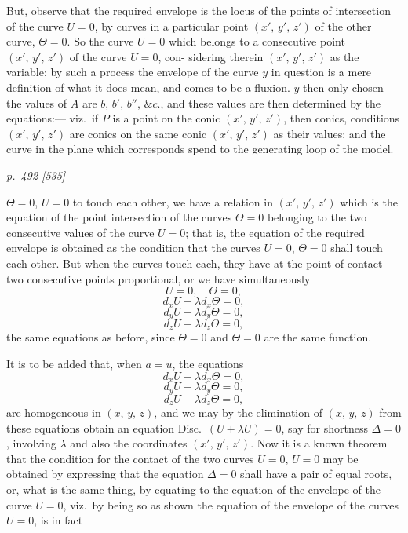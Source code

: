 \documentclass[11pt,a4paper]{book}
\begin{document}
But, observe that the required envelope is the locus of the points of intersection
of the curve $U=0$, by curves in a particular point $(x',\,y',\,z')$ of the other curve, $\Theta=0$. So
the curve $U=0$ which belongs to a consecutive point $(x',\,y',\,z')$ of the curve $U=0$, con-
sidering therein $(x',\,y',\,z')$ as the variable; by such a process the envelope of the curve
$y$ in question is a mere definition of what it does mean, and comes to be a fluxion.
$y$ then only chosen the values of $A$ are $b$, $b'$, $b''$, $\&c.$, and these values are then determined
by the equations:--- viz.\ if $P$ is a point on the conic $(x',\,y',\,z')$, then conics, conditions
$(x',\,y',\,z')$ are conics on the same conic $(x',\,y',\,z')$ as their values: and the curve in the plane which corresponds
spend to the generating loop of the model.

\clearpage

\bigskip
\textit{p.~492 [535]}
\smallskip

\noindent
$\Theta = 0$, $U = 0$ to touch each other, we have a relation in $(x',\,y',\,z')$ which is the equation
of the point intersection of the curves $\Theta = 0$ belonging to the two consecutive values
of the curve $U = 0$; that is, the equation of the required envelope is obtained as the
condition that the curves $U = 0$, $\Theta = 0$ shall touch each other. But when the curves
touch each, they have at the point of contact two consecutive points proportional,
or we have simultaneously
\[
U = 0, \quad \Theta = 0,
\]
\[
d_x U + \lambda d_x \Theta = 0,
\]
\[
d_y U + \lambda d_y \Theta = 0,
\]
\[
d_z U + \lambda d_z \Theta = 0,
\]
the same equations as before, since $\Theta = 0$ and $\Theta = 0$ are the same function.

It is to be added that, when $a = u$, the equations
\[
d_x U + \lambda d_x \Theta = 0,
\]
\[
d_y U + \lambda d_y \Theta = 0,
\]
\[
d_z U + \lambda d_z \Theta = 0,
\]
are homogeneous in $(x,\,y,\,z)$, and we may by the elimination of $(x,\,y,\,z)$ from these
equations obtain an equation Disc.\ $(U \pm \lambda U) = 0$, say for shortness $\Delta = 0$, involving $\lambda$
and also the coordinates $(x',\,y',\,z')$. Now it is a known theorem that the condition for
the contact of the two curves $U = 0$, $U = 0$ may be obtained by expressing that the
equation $\Delta = 0$ shall have a pair of equal roots, or, what is the same thing, by equating
to the equation of the envelope of the curve $U = 0$, viz.\ by being so as shown the
equation of the envelope of the curves $U = 0$, is in fact
\end{document}
